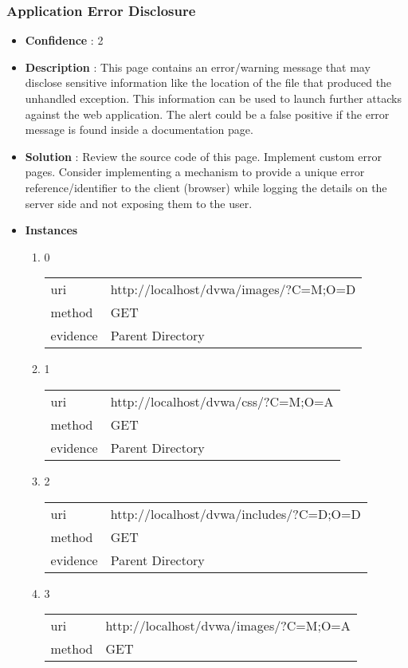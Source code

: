 \documentclass[10pt]{article}
\begin{document}
\subsubsection{Application Error Disclosure}
\begin{itemize}
\item[] \textbf{Confidence} : 2
\item[] \textbf{Description} : This page contains an error/warning message that may disclose sensitive information like the location of the file that produced the unhandled exception. This information can be used to launch further attacks against the web application. The alert could be a false positive if the error message is found inside a documentation page.
\item[] \textbf{Solution} :  Review the source code of this page. Implement custom error pages. Consider implementing a mechanism to provide a unique error reference/identifier to the client (browser) while logging the details on the server side and not exposing them to the user.
\item[] \textbf{Instances}
\begin{enumerate}
\item[] 0
\begin{tabular}{| l | p{14cm}}
uri & http://localhost/dvwa/images/?C=M;O=D \\
method & GET \\
evidence & Parent Directory \\
\end{tabular}
\item[] 1
\begin{tabular}{| l | p{14cm}}
uri & http://localhost/dvwa/css/?C=M;O=A \\
method & GET \\
evidence & Parent Directory \\
\end{tabular}
\item[] 2
\begin{tabular}{| l | p{14cm}}
uri & http://localhost/dvwa/includes/?C=D;O=D \\
method & GET \\
evidence & Parent Directory \\
\end{tabular}
\item[] 3
\begin{tabular}{| l | p{14cm}}
uri & http://localhost/dvwa/images/?C=M;O=A \\
method & GET \\

\end{tabular}
\end{enumerate}
\end{itemize}
\end{document}
